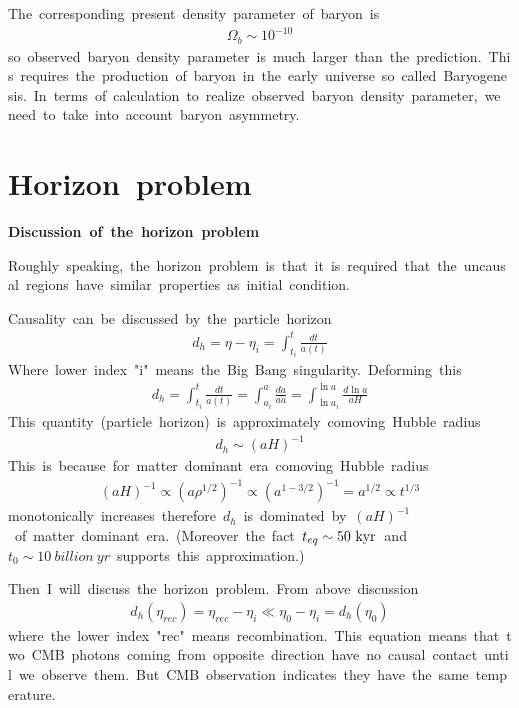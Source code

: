 The\ corresponding\ present\ density\ parameter\ of\ baryon\ is
\begin{align*}
    \Omega_b\sim10^{-10}
\end{align*}
so\ observed\ baryon\ density\ parameter\ is\ much\ larger\ than\ the\ prediction.\ This\ requires\ the\ production\ of\ baryon\ in\ the\ early\ universe\ so\ called\ Baryogenesis.\ In\ terms\ of\ calculation\ to\ realize\ observed\ baryon\ density\ parameter,\ we\ need\ to\ take\ into\ account\ baryon\ asymmetry.

\section{Horizon\ problem}
\textbf{Discussion\ of\ the\ horizon\ problem}

Roughly\ speaking,\ the\ horizon\ problem\ is\ that\ it\ is\ required\ that\ the\ uncausal\ regions\ have\ similar\ properties\ as\ initial\ condition.

Causality\ can\ be\ discussed\ by\ the\ particle\ horizon
\begin{align*}
    d_h=\eta-\eta_i=\int^{t}_{t_i}\frac{dt}{a(t)}
\end{align*}
Where\ lower\ index\ "i"\ means\ the\ Big\ Bang\ singularity.\ Deforming\ this
\begin{align*}
    d_h=\int^{t}_{t_i}\frac{dt}{a(t)}=\int^a_{a_i}\frac{da}{a\Dot{a}}=\int^{\ln{a}}_{\ln{a_i}}\frac{d\ln{a}}{aH}
\end{align*}
This\ quantity\ (particle\ horizon)\ is\ approximately\ comoving\ Hubble\ radius
\begin{align*}
    d_h\sim(aH)^{-1}
\end{align*}
This\ is\ because\ for\ matter\ dominant\ era\ comoving\ Hubble\ radius
\begin{align*}
    (aH)^{-1}\propto(a\rho^{1/2})^{-1}\propto(a^{1-3/2})^{-1}=a^{1/2}\propto t^{{1/3}}
\end{align*}
monotonically\ increases\ therefore\ $d_h$\ is\ dominated\ by\ $(aH)^{-1}$\ of\ matter\ dominant\ era.\ (Moreover\ the\ fact\ $t_{eq}\sim50\ \rm{kyr}$\ and\ $t_0\sim10\ billion\ yr$\ supports\ this\ approximation.)

Then\ I\ will\ discuss\ the\ horizon\ problem.\ From\ above\ discussion
\begin{align}
    d_h(\eta_{rec})=\eta_{rec}-\eta_i\ll\eta_0-\eta_i=d_h(\eta_0)
\end{align}
where\ the\ lower\ index\ "rec"\ means\ recombination.\ This\ equation\ means\ that\ two\ CMB\ photons\ coming\ from\ opposite\ direction\ have\ no\ causal\ contact\ until\ we\ observe\ them.\ But\ CMB\ observation\ indicates\ they\ have\ the\ same\ temperature.

